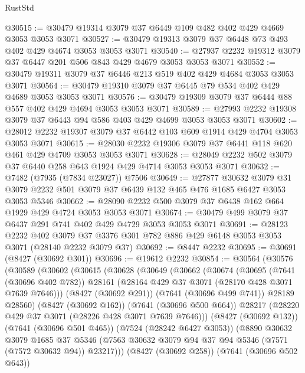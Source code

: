 \begin{lexlean}{RustStd}
\begin{coremodule}
@30515 := @30479 @19314 @3079 @37 @6449 @109 @482 @402 @429 @4669 @3053 @3053 @3071
@30527 := @30479 @19313 @3079 @37 @6448 @73 @493 @402 @429 @4674 @3053 @3053 @3071
@30540 := @27937 @2232 @19312 @3079 @37 @6447 @201 @506 @843 @429 @4679 @3053 @3053 @3071
@30552 := @30479 @19311 @3079 @37 @6446 @213 @519 @402 @429 @4684 @3053 @3053 @3071
@30564 := @30479 @19310 @3079 @37 @6445 @79 @534 @402 @429 @4689 @3053 @3053 @3071
@30576 := @30479 @19309 @3079 @37 @6444 @88 @557 @402 @429 @4694 @3053 @3053 @3071
@30589 := @27993 @2232 @19308 @3079 @37 @6443 @94 @586 @403 @429 @4699 @3053 @3053 @3071
@30602 := @28012 @2232 @19307 @3079 @37 @6442 @103 @609 @1914 @429 @4704 @3053 @3053 @3071
@30615 := @28030 @2232 @19306 @3079 @37 @6441 @118 @620 @461 @429 @4709 @3053 @3053 @3071
@30628 := @28049 @2232 @502 @3079 @37 @6440 @258 @643 @1924 @429 @4714 @3053 @3053 @3071
@30632 := @7482 (@7935 (@7834 @23027)) @7506
@30649 := @27877
    @30632
    @3079
    @31
    @3079
    @2232
    @501
    @3079
    @37
    @6439
    @132
    @465
    @476
    @1685
    @6427
    @3053
    @3053
    @5346
@30662 := @28090 @2232 @500 @3079 @37 @6438 @162 @664 @1929 @429 @4724 @3053 @3053 @3071
@30674 := @30479 @499 @3079 @37 @6437 @291 @741 @402 @429 @4729 @3053 @3053 @3071
@30691 := @28123
    @2232
    @402
    @3079
    @37
    @3376
    @301
    @782
    @886
    @429
    @6148
    @3053
    @3053
    @3071
    (@28140 @2232 @3079 @37)
@30692 := @8447 @2232
@30695 := @30691 (@8427 (@30692 @301))
@30696 := @19612 @2232
@30854 := @30564
    (@30576
      (@30589
        (@30602
          (@30615
            (@30628
              (@30649
                (@30662
                  (@30674
                    (@30695
                      (@7641 (@30696 @402 @782))
                      @28161
                      (@28164 @429 @37 @3071 (@28170 @428 @3071 @7639 @7646)))
                    (@8427 (@30692 @291))
                    (@7641 (@30696 @499 @741))
                    @28189
                    @28560)
                  (@8427 (@30692 @162))
                  (@7641 (@30696 @500 @664))
                  @28217
                  (@28220 @429 @37 @3071 (@28226 @428 @3071 @7639 @7646)))
                (@8427 (@30692 @132))
                (@7641 (@30696 @501 @465))
                (@7524 (@28242 @6427 @3053))
                (@8890
                  @30632
                  @3079
                  @1685
                  @37
                  @5346
                  (@7563 @30632 @3079 @94 @37 @94 @5346 (@7571 (@7572 @30632 @94)) @23217)))
              (@8427 (@30692 @258))
              (@7641 (@30696 @502 @643))

\end{coremodule}
\end{lexlean}
